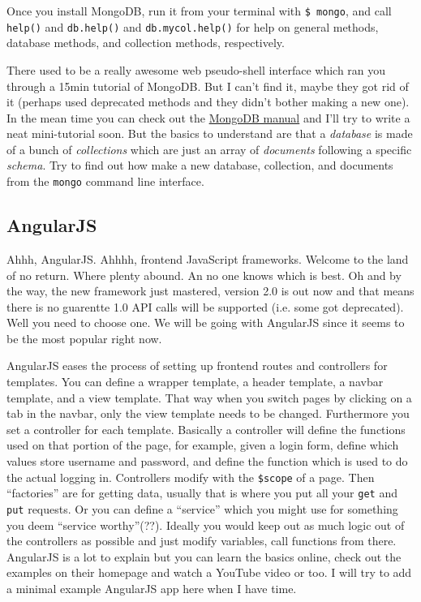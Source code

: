 Once you install MongoDB, run it from your terminal with \texttt{\$ mongo}, and
call \texttt{help()} and  \texttt{db.help()} and  \texttt{db.mycol.help()} for
help on general methods, database methods, and collection methods, respectively.

There used to be a really awesome web pseudo-shell interface which ran you
through a 15min tutorial of MongoDB. But I can't find it, maybe they got rid of
it (perhaps used deprecated methods and they didn't bother making a new one).
In the mean time you can check out the \href{http://docs.mongodb.org/manual/}{MongoDB manual}
and I'll try to write a neat mini-tutorial soon. But the basics to understand
are that a \textit{database} is made of a bunch of \textit{collections} which 
are just an array of \textit{documents} following a specific  \textit{schema}.
Try to find out how make a new database, collection, and documents from the
\texttt{mongo} command line interface. 

\subsection{AngularJS}

\noindent Ahhh, AngularJS. Ahhhh, frontend JavaScript frameworks. Welcome to the
land of no return. Where plenty abound. An no one knows which is best. Oh and
by the way, the new framework just mastered, version 2.0 is out now and that
means there is no guarentte 1.0 API calls will be supported (i.e. some got
deprecated). Well you need to choose one. We will be going with AngularJS since
it seems to be the most popular right now.

AngularJS eases the process of setting up frontend routes and controllers for
templates. You can define a wrapper template, a header template, a navbar
template, and a view template. That way when you switch pages by clicking on
a tab in the navbar, only the view template needs to be changed. Furthermore
you set a controller for each template. Basically a controller will define the 
functions used on that portion of the page, for example, given a login form,
define which values store username and password, and define the function
which is used to do the actual logging in. Controllers modify with the 
\texttt{\$scope} of a page. Then ``factories'' are for getting data, usually
that is where you put all your \texttt{get} and  \texttt{put} requests. Or
you can define a ``service'' which you might use for something you deem
``service worthy''(??). Ideally you would keep out as much logic out of the
controllers as possible and just modify variables, call functions from there.
AngularJS is a lot to explain but you can learn the basics online, check out
the examples on their homepage and watch a YouTube video or too. I will try
to add a minimal example AngularJS app here when I have time. \\

